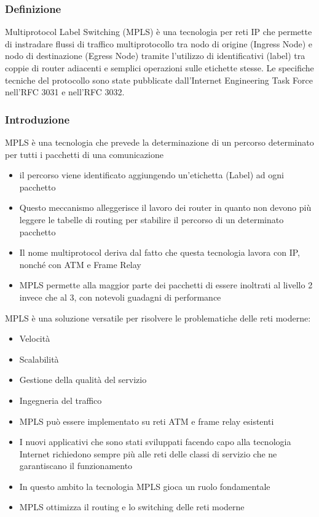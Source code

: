 \documentclass[8pt]{extarticle}
\begin{document}
\subsubsection{Definizione}
Multiprotocol Label Switching (MPLS) è una tecnologia per reti IP che permette di instradare flussi di 
traffico multiprotocollo tra nodo di origine (Ingress Node) e nodo di destinazione (Egress Node) tramite 
l'utilizzo di identificativi (label) tra coppie di router adiacenti e semplici operazioni sulle etichette 
stesse. Le specifiche tecniche del protocollo sono state pubblicate dall'Internet Engineering Task 
Force nell'RFC 3031 e nell'RFC 3032.
\subsubsection{Introduzione}
MPLS è una tecnologia che prevede la determinazione di un percorso determinato per tutti i pacchetti 
di una comunicazione
\begin{itemize}
    \item il percorso viene identificato aggiungendo un’etichetta (Label) ad ogni pacchetto
    \item Questo meccanismo alleggerisce il lavoro dei router in quanto non devono più leggere le tabelle di 
    routing per stabilire il percorso di un determinato pacchetto
    \item Il nome multiprotocol deriva dal fatto che questa tecnologia lavora con IP, nonché con ATM e Frame Relay
    \item MPLS permette alla maggior parte dei pacchetti di essere inoltrati al livello 2 invece che al 3, 
    con notevoli guadagni di performance
\end{itemize}
\noindent
MPLS è una soluzione versatile per risolvere le problematiche delle reti moderne:
\begin{itemize}
    \item Velocità
    \item Scalabilità
    \item Gestione della qualità del servizio
    \item Ingegneria del traffico
    \item MPLS può essere implementato su reti ATM e frame relay esistenti
    \item I nuovi applicativi che sono stati sviluppati facendo capo alla tecnologia Internet richiedono 
    sempre più alle reti delle classi di servizio che ne garantiscano il funzionamento
    \item In questo ambito la tecnologia MPLS gioca un ruolo fondamentale
    \item MPLS ottimizza il routing e lo switching delle reti moderne
\end{itemize}
\end{document}
